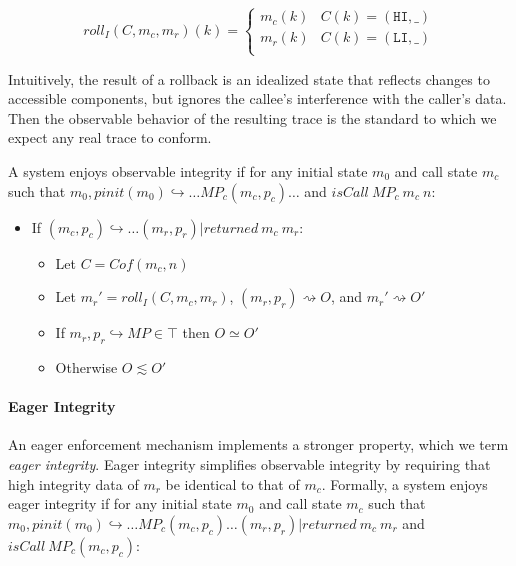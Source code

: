 \documentclass{article}
\begin{document}
      \[\mathit{roll}_I(C,m_c,m_r)(k) =
      \begin{cases}
        m_c(k) & C(k) = (\mathtt{HI},\_) \\
        m_r(k) & C(k) = (\mathtt{LI},\_) \\
      \end{cases}\]

      Intuitively, the result of a rollback is an idealized state that reflects changes to accessible
      components, but ignores the callee's interference with the caller's data. Then the observable
      behavior of the resulting trace is the standard to which we expect any real trace to conform.

      A system enjoys observable integrity if for any initial state \(m_0\) and call state \(m_c\)
      such that \(m_0,\mathit{pinit}(m_0) \hookrightarrow \dots MP_c (m_c,p_c) \dots\)
      and \(\mathit{isCall}\ MP_c\ m_c\ n\):

      \begin{itemize}
        \item If \((m_c,p_c) \hookrightarrow \dots (m_r,p_r) | \mathit{returned}\ m_c\ m_r\):
          \begin{itemize}
            \item Let \(C = \mathit{Cof(m_c,n)}\)
            \item Let \(m_r' = \mathit{roll}_I(C,m_c,m_r)\), \((m_r,p_r) \rightsquigarrow O\), and
              \(m_r' \rightsquigarrow O'\)
            \item If \(m_r,p_r \hookrightarrow MP \in \top\) then \(O \simeq O'\)
            \item Otherwise \(O \lesssim O'\)
          \end{itemize}
      \end{itemize}

    \paragraph{Eager Integrity}
 
      An eager enforcement mechanism implements a stronger property, which we term {\it eager integrity}.
      Eager integrity simplifies observable integrity by requiring that high integrity data of \(m_r\) be
      identical to that of \(m_c\). Formally, a system enjoys eager integrity if for any initial state
      \(m_0\) and call state \(m_c\) such that \(m_0,\mathit{pinit}(m_0) \hookrightarrow \dots MP_c (m_c,p_c)
      \dots (m_r,p_r) | \mathit{returned}\ m_c\ m_r\) and \(\mathit{isCall}\ MP_c (m_c,p_c)\):
\end{document}

